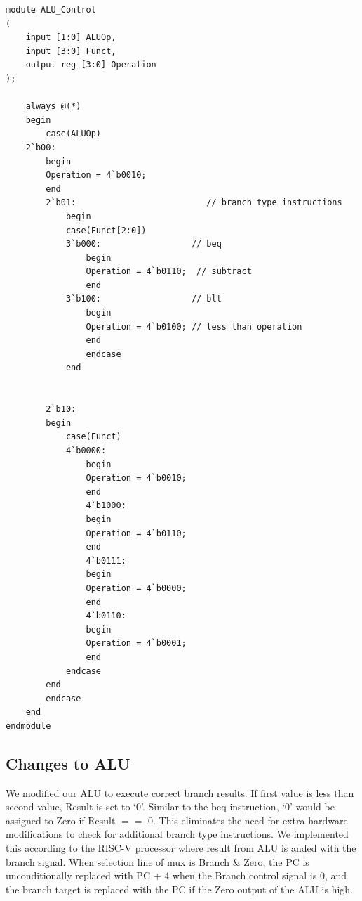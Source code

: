 \documentclass{article}
\begin{document}
\begin{lstlisting}[caption={Changes to ALU Control Unit}, captionpos=b, language=RISC-V]
module ALU_Control
(
    input [1:0] ALUOp, 
    input [3:0] Funct,
    output reg [3:0] Operation
);

    always @(*)
    begin
        case(ALUOp)
    2`b00:
        begin
        Operation = 4`b0010;
        end
        2`b01:                          // branch type instructions
            begin
            case(Funct[2:0])
            3`b000:                  // beq
                begin
                Operation = 4`b0110;  // subtract
                end
            3`b100:                  // blt
                begin
                Operation = 4`b0100; // less than operation 
                end
                endcase
            end
            
        
        2`b10:
        begin
            case(Funct)
            4`b0000: 
                begin
                Operation = 4`b0010;
                end
                4`b1000:
                begin
                Operation = 4`b0110;
                end
                4`b0111:
                begin
                Operation = 4`b0000;
                end
                4`b0110:
                begin
                Operation = 4`b0001;
                end
            endcase
        end
        endcase
    end    
endmodule
\end{lstlisting}

\subsection{Changes to ALU}

We modified our ALU to execute correct branch results. If first value is less than second value, Result is set to `0'. Similar to the beq instruction, `0' would be assigned to Zero if Result $ == $ 0. This eliminates the need for extra hardware modifications to check for additional branch type instructions. We implemented this according to the RISC-V processor where result from ALU is anded with the branch signal. When selection line of mux is Branch \& Zero, the PC is unconditionally replaced with PC + 4 when the Branch control signal is 0, and the branch target is replaced with the PC if the Zero output of the ALU is high.\\
\end{document}
